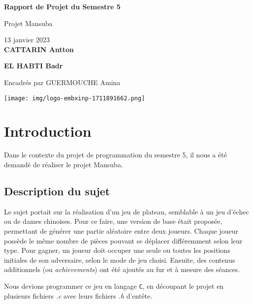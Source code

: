 \documentclass[a4paper]{article}
\begin{document}
\begin{titlepage}
\begin{center}
\vspace*{2cm}
\Huge
\textbf{Rapport de Projet du Semestre 5}

\vspace{0.5cm}
\huge
Projet Mansuba
            
\vspace{0.5cm}
\Large
13 janvier 2023 \\

\vfill
\huge
\textbf{CATTARIN Antton}

\textbf{EL HABTI Badr}

\vspace{0.5cm}
\Large
Encadrés par GUERMOUCHE Amina
       
\vfill

\texttt{[image: img/logo-embxinp-1711891662.png]}

\vspace{0.8cm}
\end{center}
\end{titlepage}

\newpage
\tableofcontents 

\listoffigures
\newpage

\section{Introduction}
\label{intro}

Dans le contexte du projet de programmation du semestre 5, il nous a été demandé de réaliser le projet Mansuba.

\subsection{Description du sujet}
\label{description}
Le sujet portait sur la réalisation d'un jeu de plateau, semblable à un jeu d'échec ou de dames chinoises. Pour ce faire, une version de base était proposée, permettant de générer une partie aléatoire entre deux joueurs. Chaque joueur possède le même nombre de pièces pouvant se déplacer différemment selon leur type. Pour gagner, un joueur doit occuper une seule ou toutes les positions initiales de son adversaire, selon le mode de jeu choisi. Ensuite, des contenus additionnels (ou \emph{achievements}) ont été ajoutés au fur et à mesure des séances.

Nous devions programmer ce jeu en langage \verb|C|, en découpant le projet en plusieurs fichiers \emph{.c} avec leurs fichiers \emph{.h} d'entête.
\end{document}
